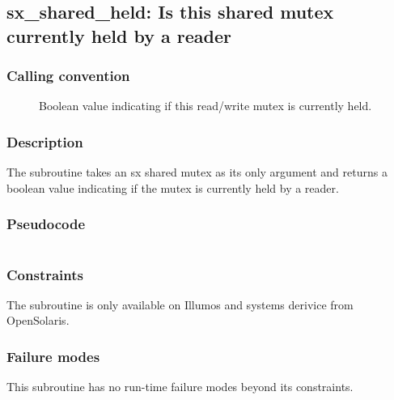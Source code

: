 \clearpage
{}
{}
\label{subr:sx-read-held}
\subsection*{sx\_shared\_held: Is this shared mutex currently held by
  a reader}

\subsubsection*{Calling convention}

\begin{description}
\item[] Boolean value indicating if this read/write
  mutex is currently held.
\end{description}

\subsubsection*{Description}

The  subroutine takes an sx shared mutex as
its only argument and returns a boolean value indicating if the mutex
is currently held by a reader.

\subsubsection*{Pseudocode}

\begin{verbatim}
\end{verbatim}

\subsubsection*{Constraints}

The  subroutine is only available on Illumos and
systems derivice from OpenSolaris.

\subsubsection*{Failure modes}

This subroutine has no run-time failure modes beyond its constraints.
